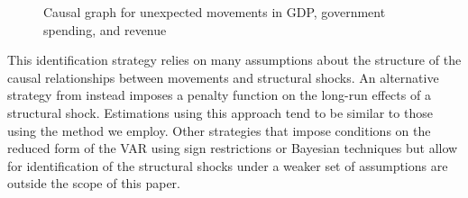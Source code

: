 \begin{figure}[t]
    \centering
    \caption{Causal graph for unexpected movements in GDP, government spending, and revenue}
    
    \label{fig:causal-graph}
\end{figure}

This identification strategy relies on many assumptions about the structure of the causal relationships between movements and structural shocks. An alternative strategy from \textcite{mountford2009effects} instead imposes a penalty function on the long-run effects of a structural shock. Estimations using this approach tend to be similar to those using the \textcite{blanchard2002empirical} method we employ. Other strategies that impose conditions on the reduced form of the VAR using sign restrictions or Bayesian techniques but allow for identification of the structural shocks under a weaker set of assumptions are outside the scope of this paper.
